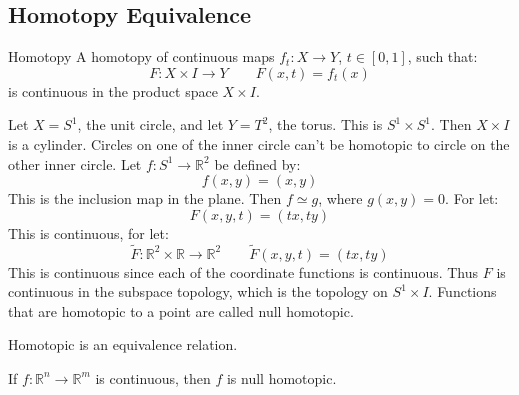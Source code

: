     \subsection{Homotopy Equivalence}
        \begin{ldefinition}{Homotopy}
            A homotopy of continuous maps
            $f_{t}:X\rightarrow{Y}$, $t\in[0,1]$, such that:
            \begin{equation}
                F:X\times{I}\rightarrow{Y}
                \quad\quad
                F(x,t)=f_{t}(x)
            \end{equation}
            is continuous in the product space $X\times{I}$.
        \end{ldefinition}
        \begin{example}
            Let $X=S^{1}$, the unit circle, and let
            $Y=T^{2}$, the torus. This is
            $S^{1}\times{S}^{1}$. Then $X\times{I}$ is
            a cylinder. Circles on one of the inner circle
            can't be homotopic to circle on the other
            inner circle. Let
            $f:S^{1}\rightarrow\mathbb{R}^{2}$ be defined by:
            \begin{equation}
                f(x,y)=(x,y)
            \end{equation}
            This is the inclusion map in the plane. Then
            $f\simeq{g}$, where $g(x,y)=0$. For let:
            \begin{equation}
                F(x,y,t)=(tx,ty)
            \end{equation}
            This is continuous, for let:
            \begin{equation}
                \tilde{F}:\mathbb{R}^{2}\times\mathbb{R}
                \rightarrow\mathbb{R}^{2}\quad\quad
                \tilde{F}(x,y,t)=(tx,ty)
            \end{equation}
            This is continuous since each of the
            coordinate functions is continuous. Thus
            $F$ is continuous in the subspace topology, which
            is the topology on $S^{1}\times{I}$. Functions
            that are homotopic to a point are called null
            homotopic.
        \end{example}
        \begin{theorem}
            Homotopic is an equivalence relation.
        \end{theorem}
        \begin{theorem}
            If $f:\mathbb{R}^{n}\rightarrow\mathbb{R}^{m}$
            is continuous, then $f$ is null homotopic.
        \end{theorem}

